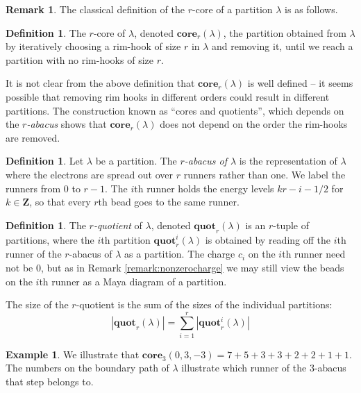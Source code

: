 \documentclass{amsart}[12pt]
\theoremstyle{definition}
\newtheorem{example}[dummy]{Example}
\newtheorem{definition}[dummy]{Definition}
\newtheorem{remark}[dummy]{Remark}
\newcommand{\Z}{\mathbf{Z}}
\newcommand{\core}{\mathbf{core}}
\newcommand{\quot}{\mathbf{quot}}
\begin{document}
\begin{remark}
The classical definition of the $r$-core of a partition $\lambda$ is as follows.

\begin{definition} 
The $r$-core of $\lambda$, denoted $\core_r(\lambda)$, the partition obtained from $\lambda$ by iteratively choosing a rim-hook of size $r$ in $\lambda$ and removing it, until we reach a partition with no rim-hooks of size $r$.
\end{definition}

It is not clear from the above definition that $\core_r(\lambda)$ is well defined -- it seems possible that removing rim hooks in different orders could result in different partitions.  The construction known as ``cores and quotients'', which depends on the \emph{$r$-abacus} shows that $\core_r(\lambda)$ does not depend on the order the rim-hooks are removed.  


\begin{definition}
  Let $\lambda$ be a partition.  The \emph{$r$-abacus of $\lambda$} is the representation of $\lambda$ where the electrons are spread out over $r$ runners rather than one.  We label the runners from $0$ to $r-1$. The $i$th runner holds the energy levels $kr-i-1/2$ for $k\in\Z$, so that every $r$th bead goes to the same runner.  
\end{definition}

\begin{definition} \label{def:quotients}
The \emph{$r$-quotient} of $\lambda$, denoted $\quot_r(\lambda)$ is an $r$-tuple of partitions, where the $i$th partition $\quot_r^i(\lambda)$ is obtained by reading off the $i$th runner of the $r$-abacus of $\lambda$ as a partition.  The charge $c_i$ on the $i$th runner need not be 0, but as in Remark \ref{remark:nonzerocharge} we may still view the beads on the $i$th runner as a Maya diagram of a partition. 

The size of the $r$-quotient is the sum of the sizes of the individual partitions: 
$$|\quot_r(\lambda)|=\sum_{i=1}^r |\quot_r^i(\lambda)|$$
\end{definition}





\begin{example} \label{ex:coresquotients}
We illustrate that $\core_3(0,3, -3)=7+5+3+3+2+2+1+1$.  The numbers on the boundary path of $\lambda$ illustrate which runner of the 3-abacus that step belongs to.

\begin{center}
\begin{tikzpicture}


\end{tikzpicture}
\end{center}
\end{example}
\end{remark}
\end{document}
